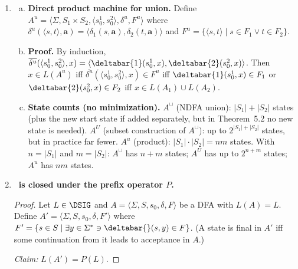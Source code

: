 \begin{enumerate}[{5.}1. ]
1.  Build the NDFA $A^\cup=\langle\Sigma,S_1\cup S_2,\{s^1_0,s^2_0\},\delta^\cup,F_1\cup F_2\rangle$
    (as in Theorem~5.2).
2.  Apply Definition~4.5 (subset construction) to $A^\cup$ to produce a DFA $A^U$.
    Start state: $\{s^1_0,s^2_0\}$.
    For each reachable state-set $Q\subseteq S_1\cup S_2$ and each $\pmb{a}\in\Sigma$:
    $\delta^U(Q,\pmb{a})=\delta^d(Q,\pmb{a})=\bigcup_{q\in Q}\delta^\cup(q,\pmb{a})$.
    Final states: all $Q$ with $Q\cap(F_1\cup F_2)\neq\emptyset$.

\item \begin{enumerate}[(a)]
  \item \textbf{Direct product machine for union.}  Define
  $A^u=\langle\Sigma,S_1\times S_2,\langle s^1_0,s^2_0\rangle,\delta^u,F^u\rangle$ where
  $\delta^u(\langle s,t\rangle,\pmb{a})=\langle\delta_1(s,\pmb{a}),\delta_2(t,\pmb{a})\rangle$
  and $F^u=\{\langle s,t\rangle\mid s\in F_1\vee t\in F_2\}$.

  \item \textbf{Proof.}  By induction, $\overline{\delta^u}(\langle s^1_0,s^2_0\rangle,x)
  =\langle\deltabar{1}(s^1_0,x),\deltabar{2}(s^2_0,x)\rangle$.
  Then $x\in L(A^u)$ iff $\overline{\delta^u}(\langle s^1_0,s^2_0\rangle,x)\in F^u$
  iff $\deltabar{1}(s^1_0,x)\in F_1$ or $\deltabar{2}(s^2_0,x)\in F_2$
  iff $x\in L(A_1)\cup L(A_2)$.

  \item \textbf{State counts (no minimization).}
  $A^\cup$ (NDFA union): $|S_1|+|S_2|$ states (plus the new start state if added separately, but in Theorem~5.2 no new state is needed).
  $A^U$ (subset construction of $A^\cup$): up to $2^{|S_1|+|S_2|}$ states, but in practice far fewer.
  $A^u$ (product): $|S_1|\cdot|S_2|=nm$ states.
  With $n=|S_1|$ and $m=|S_2|$: $A^\cup$ has $n+m$ states; $A^U$ has up to $2^{n+m}$ states; $A^u$ has $nm$ states.
\end{enumerate}

\item \textbf{\DSIG\ is closed under the prefix operator $P$.}

\begin{proof}
Let $L\in\DSIG$ and $A=\langle\Sigma,S,s_0,\delta,F\rangle$ be a DFA with $L(A)=L$.
Define $A'=\langle\Sigma,S,s_0,\delta,F'\rangle$ where
$F'=\{s\in S\mid\exists y\in\Sigma^*\ni\deltabar{}(s,y)\in F\}$.
(A state is final in $A'$ iff some continuation from it leads to acceptance in $A$.)

\emph{Claim:} $L(A')=P(L)$.


\end{proof}
\end{enumerate}
